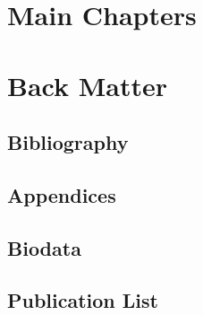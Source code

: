 \documentclass[a4paper,nofonts,raggedright,titlepage,openany]{tufte-book}
\begin{document}
\section{Main Chapters}


\section{Back Matter}
\subsection{Bibliography}

\subsection{Appendices}

\subsection{Biodata}

\subsection{Publication List}
\end{document}
